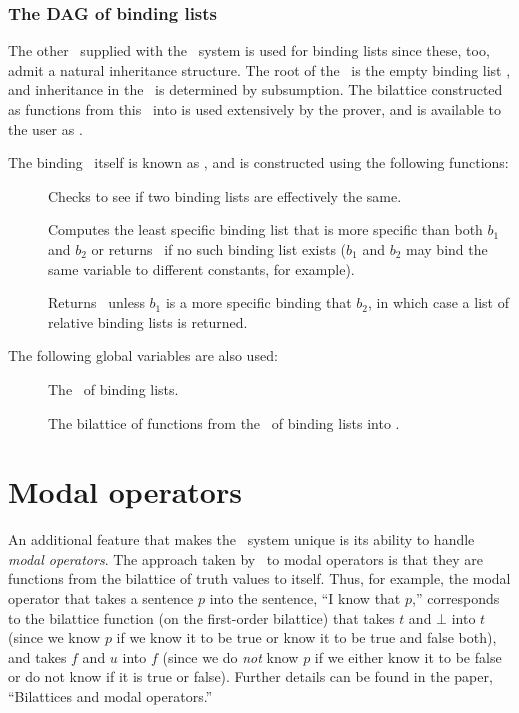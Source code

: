\subsubsection{The DAG of binding lists}
\label{s.binding-dag}

The other \dg\ supplied with the \mvl\ system is used for binding
lists since these, too, admit a natural inheritance structure.  The
root of the \dg\ is the empty binding list \NIL, and inheritance in
the \dg\ is determined by subsumption.  The bilattice constructed as
functions from this \dg\ into  is used
extensively by the prover, and is available to the user as
.

The binding \dg\ itself is known as , and is constructed
using the following functions:
 \begin{description}
 \item [] Checks to see if two binding
lists are effectively the same.
 \item [] Computes the least
specific binding list that is more specific than both $b_1$ and $b_2$
or returns \NIL\ if no such binding list exists ($b_1$ and $b_2$ may
bind the same variable to different constants, for example).
 \item [] Returns \NIL\ unless $b_1$ is a more
specific binding that $b_2$, in which case a list of relative binding
lists is returned.
 \end{description}

The following global variables are also used:
 \begin{description}
 \item [] The \dg\ of binding lists.
 \item [] The bilattice of functions from
the \dg\ of binding lists into .
 \end{description}

\section{Modal operators}
\label{s.modal}

An additional feature that makes the \mvl\ system unique is its
ability to handle {\em modal operators}.  The approach taken by \mvl\
to modal operators is that they are functions from the bilattice of
truth values to itself.  Thus, for example, the modal operator that
takes a sentence $p$ into the sentence, ``I know that $p$,''
corresponds to the bilattice function (on the first-order bilattice)
that takes $t$ and $\bot$ into $t$ (since we know $p$ if we know it
to be true or know it to be true and false both), and takes $f$ and
$u$ into $f$ (since we do {\em not\/} know $p$ if we either know it
to be false or do not know if it is true or false).  Further details
can be found in the paper, ``Bilattices and modal operators.''

